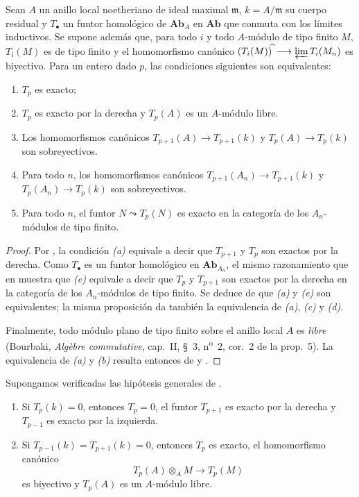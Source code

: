 \begin{proposition}[7.5.4]
\label{III.7.5.4}
Sean $A$ un anillo local noetheriano de ideal maximal $\mathfrak m$,
$k=A/\mathfrak m$ su cuerpo residual y $T_\bullet$ un funtor
homológico de $\mathbf{Ab}_A$ en $\mathbf{Ab}$ que conmuta con los límites
inductivos. Se supone además que, para todo $i$ y todo $A$-módulo
de tipo finito $M$, $T_i(M)$ es de tipo finito y el homomorfismo
canónico
$(T_i(M))^{\widehat{\,}}\longrightarrow\varprojlim T_i(M_n)$
es biyectivo. Para un entero dado $p$, las condiciones siguientes
son equivalentes:
\begin{enumerate}
  \item[(a)] $T_p$ es exacto;
  \item[(b)] $T_p$ es exacto por la derecha y $T_p(A)$ es un
    $A$-módulo libre.
  \item[c)] Los homomorfismos canónicos
    $T_{p+1}(A)\longrightarrow T_{p+1}(k)$ y $T_p(A)\longrightarrow T_p(k)$
    son sobreyectivos.
  \item[d)] Para todo $n$, los homomorfismos canónicos
    $T_{p+1}(A_n)\longrightarrow T_{p+1}(k)$ y $T_p(A_n)\longrightarrow T_p(k)$
    son sobreyectivos.
  \item[e)] Para todo $n$, el funtor $N\leadsto T_p(N)$ es exacto
    en la categoría de los $A_n$-módulos de tipo finito.
\end{enumerate}
\end{proposition}

\begin{proof}
Por , la condición \emph{(a)} equivale a decir que
$T_{p+1}$ y $T_p$ son exactos por la derecha. Como $T_\bullet$ es
un funtor homológico en $\boldsymbol{Ab}_{A_n}$, el mismo razonamiento que
en  muestra que \emph{(e)} equivale a decir que $T_p$ y
$T_{p+1}$ son exactos por la derecha en la categoría de los
$A_n$-módulos de tipo finito. Se deduce de  que \emph{(a)}
y \emph{(e)} son equivalentes; la misma proposición da también la
equivalencia de \emph{(a)}, \emph{(c)} y \emph{(d)}.

Finalmente, todo módulo plano de tipo finito sobre el anillo local
$A$ es \emph{libre} (Bourbaki, \emph{Algèbre commutative}, cap.~II,
\S~3, n\textsuperscript{o}~2, cor.~2 de la prop.~5). La equivalencia
de \emph{(a)} y \emph{(b)} resulta entonces de  y
.
\end{proof}

\begin{corollary}[7.5.5]
\label{III.7.5.5}
Supongamos verificadas las hipótesis generales de
.
\begin{enumerate}
  \item[\textup{(i)}] Si $T_p(k)=0$, entonces $T_p=0$, el funtor $T_{p+1}$
    es exacto por la derecha y $T_{p-1}$ es exacto por la izquierda.
  \item[\textup{(ii)}] Si $T_{p-1}(k)=T_{p+1}(k)=0$, entonces $T_p$ es
    exacto, el homomorfismo canónico
    \[
      T_p(A)\otimes_A M\longrightarrow T_p(M)
    \]
    es biyectivo y $T_p(A)$ es un $A$-módulo libre.
\end{enumerate}
\end{corollary}

